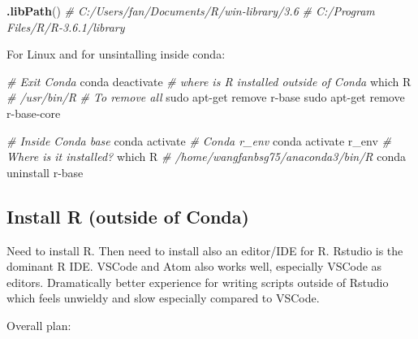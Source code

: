 \documentclass[]{article}
\newenvironment{Shaded}{\begin{snugshade}}{\end{snugshade}}
\newcommand{\CommentTok}[1]{\textcolor[rgb]{0.56,0.35,0.01}{\textit{#1}}}
\newcommand{\ExtensionTok}[1]{#1}
\newcommand{\FunctionTok}[1]{\textcolor[rgb]{0.00,0.00,0.00}{#1}}
\newcommand{\KeywordTok}[1]{\textcolor[rgb]{0.13,0.29,0.53}{\textbf{#1}}}
\newcommand{\NormalTok}[1]{#1}
\begin{document}
\begin{Shaded}
\begin{Highlighting}[]
\KeywordTok{.libPath}\NormalTok{()}
\CommentTok{# C:/Users/fan/Documents/R/win-library/3.6}
\CommentTok{# C:/Program Files/R/R-3.6.1/library}
\end{Highlighting}
\end{Shaded}

For Linux and for unsintalling inside conda:

\begin{Shaded}
\begin{Highlighting}[]
\CommentTok{# Exit Conda}
\ExtensionTok{conda}\NormalTok{ deactivate}
\CommentTok{# where is R installed outside of Conda}
\FunctionTok{which}\NormalTok{ R}
\CommentTok{# /usr/bin/R}
\CommentTok{# To remove all}
\FunctionTok{sudo}\NormalTok{ apt-get remove r-base}
\FunctionTok{sudo}\NormalTok{ apt-get remove r-base-core}

\CommentTok{# Inside Conda base}
\ExtensionTok{conda}\NormalTok{ activate}
\CommentTok{# Conda r_env}
\ExtensionTok{conda}\NormalTok{ activate r_env}
\CommentTok{# Where is it installed?}
\FunctionTok{which}\NormalTok{ R}
\CommentTok{# /home/wangfanbsg75/anaconda3/bin/R}
\ExtensionTok{conda}\NormalTok{ uninstall r-base}
\end{Highlighting}
\end{Shaded}

\hypertarget{install-r-outside-of-conda}{%
\subsection{Install R (outside of
Conda)}\label{install-r-outside-of-conda}}

Need to install R. Then need to install also an editor/IDE for R.
Rstudio is the dominant R IDE. VSCode and Atom also works well,
especially VSCode as editors. Dramatically better experience for writing
scripts outside of Rstudio which feels unwieldy and slow especially
compared to VSCode.

Overall plan:
\end{document}
